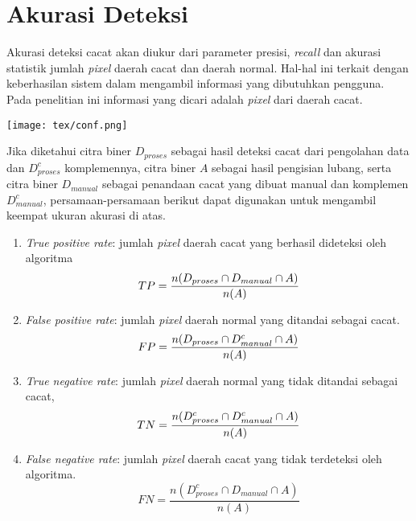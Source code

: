 \documentclass[laporan.tex]{subfiles}
\begin{document}
\section{Akurasi Deteksi}

Akurasi deteksi cacat akan diukur dari parameter presisi, \emph{recall} dan akurasi statistik jumlah \emph{pixel} daerah cacat dan daerah normal. Hal-hal ini terkait dengan keberhasilan sistem dalam mengambil informasi yang dibutuhkan pengguna. Pada penelitian ini informasi yang dicari adalah \emph{pixel} dari daerah cacat.

\texttt{[image: tex/conf.png]}

Jika diketahui citra biner $D_{proses}$ sebagai hasil deteksi cacat dari pengolahan data dan $D_{proses}^c$ komplemennya, citra biner $A$ sebagai hasil pengisian lubang, serta citra biner $D_{manual}$ sebagai penandaan cacat yang dibuat manual dan komplemen $D_{manual}^c$, persamaan-persamaan berikut dapat digunakan untuk mengambil keempat ukuran akurasi di atas.

\begin{enumerate}
\item \emph{True positive rate}: jumlah \emph{pixel} daerah cacat yang berhasil dideteksi oleh algoritma
\begin{equation*}
TP = \frac{n(D_{proses} \cap D_{manual} \cap A)}{n(A)} \nonumber \\
\end{equation*}
\item \emph{False positive rate}: jumlah \emph{pixel} daerah normal yang ditandai sebagai cacat.
\begin{equation*}
FP = \frac{n(D_{proses} \cap D_{manual}^c \cap A)}{n(A)} \nonumber \\
\end{equation*}
\item \emph{True negative rate}: jumlah \emph{pixel} daerah normal yang tidak ditandai sebagai cacat, 
\begin{equation*}
TN = \frac{n(D_{proses}^c \cap D_{manual}^c \cap A)}{n(A)} \nonumber \\
\end{equation*}
\item \emph{False negative rate}: jumlah \emph{pixel} daerah cacat yang tidak terdeteksi oleh algoritma.
\begin{equation*}
FN = \frac{n(D_{proses}^c \cap D_{manual} \cap A)}{n(A)}
\end{equation*}
\end{enumerate}
\end{document}
